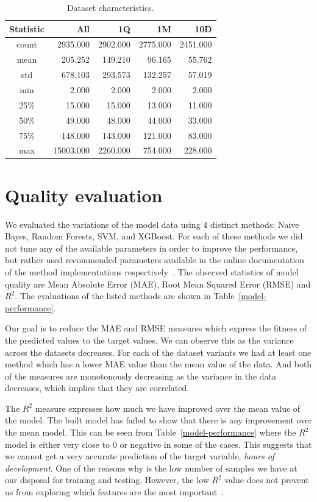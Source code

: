 \documentclass[conference,compsoc]{IEEEtran}
\begin{document}
\begin{table}[!t]
	\caption{Dataset characteristics. }
	\label{dataset-description}
	\centering
	\begin{tabular}{c|r|r|r|r}
		Statistic &        All  & 1Q & 1M & 10D \\
		\hline
		count &  2935.000  &     2902.000  &   2775.000 &   2451.000 \\
		mean  &   205.252  &      149.210  &     96.165 &     55.762 \\
		std   &   678.103  &      293.573  &    132.257 &     57.019 \\
		min   &     2.000  &        2.000  &      2.000 &      2.000 \\
		25\%   &    15.000  &       15.000  &     13.000 &     11.000 \\
		50\%   &    49.000  &       48.000  &     44.000 &     33.000 \\
		75\%   &   148.000  &      143.000  &    121.000 &     83.000 \\
		max   & 15003.000  &     2260.000  &    754.000 &    228.000 \\
	\end{tabular}
\end{table}


\section{Quality evaluation}
We evaluated the variations of the model data using 4 distinct methods: Naive Bayes, Random Forests, SVM, and XGBoost. For each of these methods we did not tune any of the available parameters in order to improve the performance, but rather used recommended parameters available in the online documentation of the method implementations respectively~\cite{chen2016xgboost, scikit-learn}. The observed statistics of model quality are Mean Absolute Error (MAE), Root Mean Squared Error (RMSE) and $R^2$. The evaluations of the listed methods are shown in Table~\ref{model-performance}.

Our goal is to reduce the MAE and RMSE measures which express the fitness of the predicted values to the target values. We can observe this as the variance across the datasets decreases. For each of the dataset variants we had at least one method which has a lower MAE value than the mean value of the data. And both of the measures are monotonously decreasing as the variance in the data decreases, which implies that they are correlated.

The $R^2$ measure expresses how much we have improved over the mean value of the model. The built model has failed to show that there is any improvement over the mean model. This can be seen from Table~\ref{model-performance} where the $R^2$ model is either very close to $0$ or negative in some of the cases. This suggests that we cannot get a very accurate prediction of the target variable, \textit{hours of development}. One of the reasons why is the low number of samples we have at our disposal for training and testing. However, the low $R^2$ value does not prevent us from exploring which features are the most important~\cite{editor_regression_nodate, editor_how_regression}.
\end{document}

